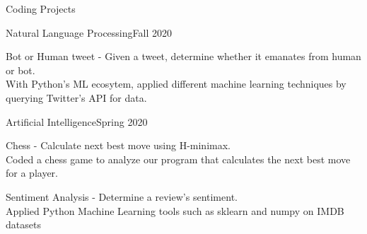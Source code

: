 \documentclass{resume} %
\begin{document}
\begin{rSection}{Coding Projects}
    \begin{rSubsection}{Natural Language Processing}{Fall 2020}{}{}
        \item Bot or Human tweet - Given a tweet, determine whether it emanates from human or bot.\\
           With Python's ML ecosytem, applied different machine learning techniques by 
           querying Twitter's API for data.

    \end{rSubsection}

    \begin{rSubsection}{Artificial Intelligence}{Spring 2020}{}{}
        \item Chess - Calculate next best move using H-minimax. \\
            Coded a chess game to analyze our program that calculates the next best move for a player.
        \item Sentiment Analysis - Determine a review's sentiment.\\
            Applied Python Machine Learning tools such as sklearn and numpy on IMDB  datasets
    \end{rSubsection}


\end{rSection}
\end{document}
